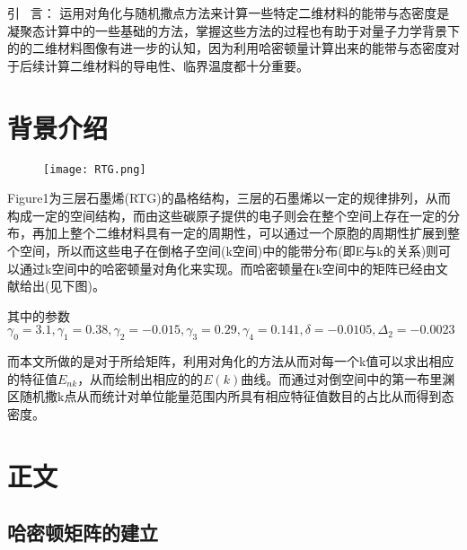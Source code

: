 \documentclass[UTF8]{ctexart}
\begin{document}
	\begin{multicols}{2}%
		
		\linespread{1.1}%
		\setlength{\parskip}{0em}%
		
		
		引 \ 言：
		\fontsize{10.5pt}{\baselineskip}\selectfont 
		运用对角化与随机撒点方法来计算一些特定二维材料的能带与态密度是凝聚态计算中的一些基础的方法，掌握这些方法的过程也有助于对量子力学背景下的的二维材料图像有进一步的认知，因为利用哈密顿量计算出来的能带与态密度对于后续计算二维材料的导电性、临界温度都十分重要。
		
		\section{背景介绍}
		\begin{figure}[H]
			\centering
			\texttt{[image: RTG.png]}
		\end{figure}
		
        
        Figure1为三层石墨烯(RTG)的晶格结构，三层的石墨烯以一定的规律排列，从而构成一定的空间结构，而由这些碳原子提供的电子则会在整个空间上存在一定的分布，再加上整个二维材料具有一定的周期性，可以通过一个原胞的周期性扩展到整个空间，所以而这些电子在倒格子空间(k空间)中的能带分布(即E与k的关系)则可以通过k空间中的哈密顿量对角化来实现。而哈密顿量在k空间中的矩阵已经由文献给出(见下图)。
        
        
        其中的参数$\gamma_0=3.1,\gamma_1=0.38,\gamma_2=-0.015,\gamma_3=0.29,\gamma_4=0.141,\delta=-0.0105,\Delta_2=-0.0023$
        
        而本文所做的是对于所给矩阵，利用对角化的方法从而对每一个k值可以求出相应的特征值$E_{nk}$，从而绘制出相应的的$E(k)$曲线。而通过对倒空间中的第一布里渊区随机撒k点从而统计对单位能量范围内所具有相应特征值数目的占比从而得到态密度。
		
		\section{正文}
		\subsection{哈密顿矩阵的建立}


\end{multicols}
\end{document}
